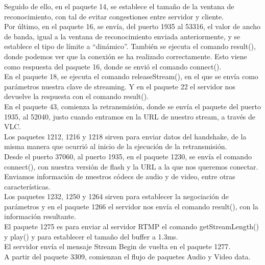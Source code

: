 \documentclass[spanish]{article}
\begin{document}
Seguido de ello, en el paquete 14, se establece el tamaño de
la ventana de reconocimiento, con tal de evitar congestiones
entre servidor y cliente.\\

Por último, en el paquete 16, se envía, del puerto 1935 al
53316, el valor de ancho de banda, igual a la ventana de
reconocimiento enviada anteriormente, y se establece el tipo
de límite a ``dinámico''. También se ejecuta el comando
result(), donde podemos ver que la conexión se ha realizado
correctamente. Esto viene como respuesta del paquete 16,
donde se envió el comando connect().\\

En el paquete 18, se ejecuta el comando releaseStream(), en
el que se envía como parámetros nuestra clave de streaming.
Y en el paquete 22 el servidor nos devuelve la respuesta
con el comando result().\\

En el paquete 43, comienza la retransmisión, donde se envía
el paquete del puerto 1935, al 52040, justo cuando entramos
en la URL de nuestro stream, a través de VLC.\\

Los paquetes 1212, 1216 y 1218 sirven para enviar datos del
handshake, de la misma manera que ocurrió al inicio de la
ejecución de la retransmisión.\\

Desde el puerto 37060, al puerto 1935, en el paquete 1230,
se envía el comando connect(), con nuestra versión de flash
y la URL a la que nos queremos conectar. Enviamos
información de nuestros códecs de audio y de video, entre
otras características.\\

Los paquetes 1232, 1250 y 1264 sirven para establecer la
negociación de parámetros y en el paquete 1266 el servidor
nos envía el comando result(), con la información
resultante.\\

El paquete 1275 es para enviar al servidor RTMP el comando
getStreamLength() y play() y para establecer el tamaño del
buffer a 1.3ms.\\

El servidor envía el mensaje Stream Begin de vuelta en el
paquete 1277.\\

A partir del paquete 3309, comienzan el flujo de paquetes
Audio y Video data.

\subsection{}
\end{document}
